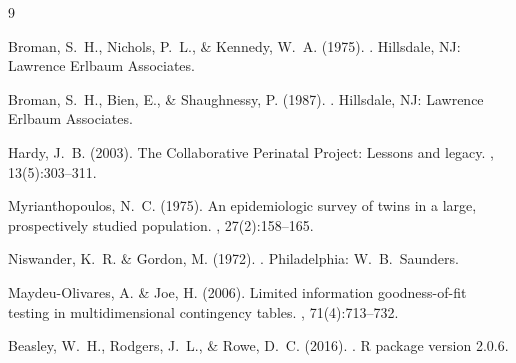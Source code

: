 \documentclass[12pt]{article}
\begin{document}

\begin{thebibliography}{9}

Broman, S.~H., Nichols, P.~L., \& Kennedy, W.~A. (1975).
.
\newblock Hillsdale, NJ: Lawrence Erlbaum Associates.

Broman, S.~H., Bien, E., \& Shaughnessy, P. (1987).
.
\newblock Hillsdale, NJ: Lawrence Erlbaum Associates.

Hardy, J.~B. (2003).
\newblock The {C}ollaborative {P}erinatal {P}roject: Lessons and legacy.
, 13(5):303--311.

Myrianthopoulos, N.~C. (1975).
\newblock An epidemiologic survey of twins in a large, prospectively studied population.
, 27(2):158--165.

Niswander, K.~R. \& Gordon, M. (1972).
.
\newblock Philadelphia: W.~B.\ Saunders.

Maydeu-Olivares, A. \& Joe, H. (2006).
\newblock Limited information goodness-of-fit testing in multidimensional contingency tables.
, 71(4):713--732.

Beasley, W.~H., Rodgers, J.~L., \& Rowe, D.~C. (2016).
.
\newblock R package version 2.0.6.

\end{thebibliography}
\end{document}
